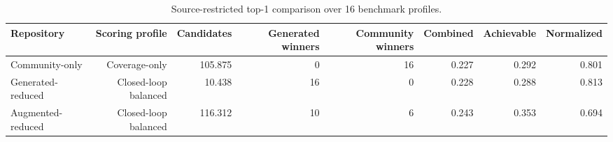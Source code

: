 \begin{table}[tb]
\centering
\caption{Source-restricted top-1 comparison over 16 benchmark profiles.}
\label{tab:corrected_closed_loop_comparison}
\begin{tabular}{lrrrrrrr}
\toprule
Repository & Scoring profile & Candidates & Generated winners & Community winners & Combined & Achievable & Normalized \\
\midrule
Community-only & Coverage-only & 105.875 & 0 & 16 & 0.227 & 0.292 & 0.801 \\
Generated-reduced & Closed-loop balanced & 10.438 & 16 & 0 & 0.228 & 0.288 & 0.813 \\
Augmented-reduced & Closed-loop balanced & 116.312 & 10 & 6 & 0.243 & 0.353 & 0.694 \\
\bottomrule
\end{tabular}
\end{table}
